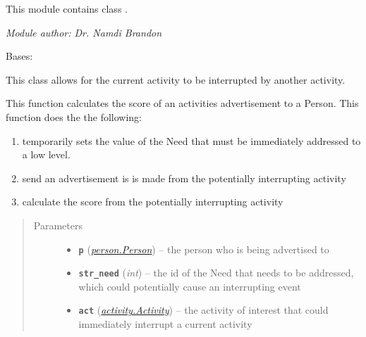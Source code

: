 \documentclass[letterpaper,10pt,english]{sphinxmanual}
\begin{document}
This module contains class {\hyperref[interrupt:interrupt.Interrupt]{\emph{}}}.

\emph{Module author: Dr. Namdi Brandon}

\begin{fulllineitems}
\label{interrupt:interrupt.Interrupt}
Bases: {\hyperref[activity:activity.Activity]{\emph{}}}

This class allows for the current activity to be interrupted by another activity.

\begin{fulllineitems}
\label{interrupt:interrupt.Interrupt.advertise}
This function calculates the score of an activities advertisement to a Person. This function does the         the following:
\begin{enumerate}
\item {} 
temporarily sets the value of the Need that must be immediately addressed to a low level.

\item {} 
send an advertisement is is made from the potentially interrupting activity

\item {} 
calculate the score from the potentially interrupting activity

\end{enumerate}
\begin{quote}\begin{description}
\item[{Parameters}] \leavevmode\begin{itemize}
\item {} 
\textbf{\texttt{p}} ({\hyperref[person:person.Person]{\emph{\emph{person.Person}}}}) -- the person who is being advertised to

\item {} 
\textbf{\texttt{str\_need}} (\emph{int}) -- the id of the Need that needs to be addressed, which                                 could potentially cause an interrupting event

\item {} 
\textbf{\texttt{act}} ({\hyperref[activity:activity.Activity]{\emph{\emph{activity.Activity}}}}) -- the activity of interest that could immediately                             interrupt a current activity


\end{itemize}
\end{description}
\end{quote}
\end{fulllineitems}
\end{fulllineitems}
\end{document}
